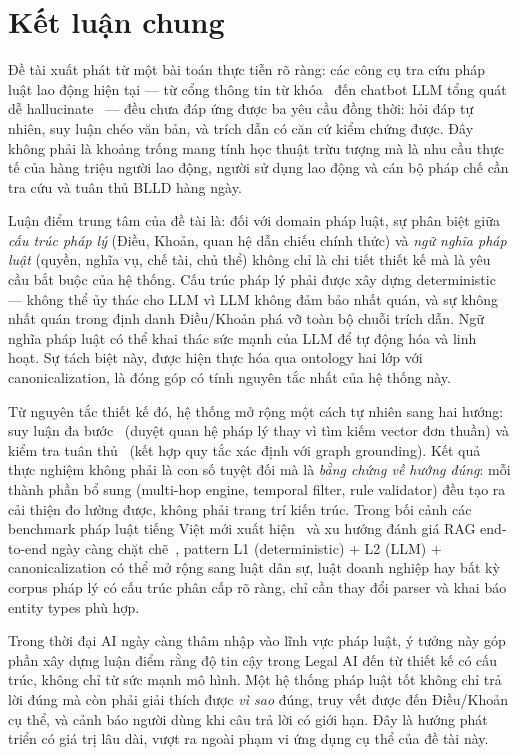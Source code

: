 \documentclass[../DoAn.tex]{subfiles}
\begin{document}
\section{Kết luận chung}
\label{section:6.5}

Đề tài xuất phát từ một bài toán thực tiễn rõ ràng: các công cụ tra cứu pháp luật lao động hiện tại --- từ cổng thông tin từ khóa~\cite{robertson1994bm25} đến chatbot LLM tổng quát dễ hallucinate~\cite{ji2023hallucination} --- đều chưa đáp ứng được ba yêu cầu đồng thời: hỏi đáp tự nhiên, suy luận chéo văn bản, và trích dẫn có căn cứ kiểm chứng được. Đây không phải là khoảng trống mang tính học thuật trừu tượng mà là nhu cầu thực tế của hàng triệu người lao động, người sử dụng lao động và cán bộ pháp chế cần tra cứu và tuân thủ \gls{BLLD} hàng ngày.

Luận điểm trung tâm của đề tài là: đối với domain pháp luật, sự phân biệt giữa \emph{cấu trúc pháp lý} (Điều, Khoản, quan hệ dẫn chiếu chính thức) và \emph{ngữ nghĩa pháp luật} (quyền, nghĩa vụ, chế tài, chủ thể) không chỉ là chi tiết thiết kế mà là yêu cầu bắt buộc của hệ thống. Cấu trúc pháp lý phải được xây dựng deterministic --- không thể ủy thác cho LLM vì LLM không đảm bảo nhất quán, và sự không nhất quán trong định danh Điều/Khoản phá vỡ toàn bộ chuỗi trích dẫn. Ngữ nghĩa pháp luật có thể khai thác sức mạnh của LLM để tự động hóa và linh hoạt. Sự tách biệt này, được hiện thực hóa qua ontology hai lớp với canonicalization, là đóng góp có tính nguyên tắc nhất của hệ thống này.

Từ nguyên tắc thiết kế đó, hệ thống mở rộng một cách tự nhiên sang hai hướng: suy luận đa bước~\cite{trivedi2022ircot} (duyệt quan hệ pháp lý thay vì tìm kiếm vector đơn thuần) và kiểm tra tuân thủ~\cite{hendrycks2021cuad} (kết hợp quy tắc xác định với graph grounding). Kết quả thực nghiệm không phải là con số tuyệt đối mà là \emph{bằng chứng về hướng đúng}: mỗi thành phần bổ sung (multi-hop engine, temporal filter, rule validator) đều tạo ra cải thiện đo lường được, không phải trang trí kiến trúc. Trong bối cảnh các benchmark pháp luật tiếng Việt mới xuất hiện~\cite{dong2025vietlegal} và xu hướng đánh giá RAG end-to-end ngày càng chặt chẽ~\cite{butler2026legalragbench,das2026claimraglaw}, pattern L1 (deterministic) + L2 (LLM) + canonicalization có thể mở rộng sang luật dân sự, luật doanh nghiệp hay bất kỳ corpus pháp lý có cấu trúc phân cấp rõ ràng, chỉ cần thay đổi parser và khai báo entity types phù hợp.

Trong thời đại AI ngày càng thâm nhập vào lĩnh vực pháp luật, ý tưởng này góp phần xây dựng luận điểm rằng độ tin cậy trong Legal AI đến từ thiết kế có cấu trúc, không chỉ từ sức mạnh mô hình. Một hệ thống pháp luật tốt không chỉ trả lời đúng mà còn phải giải thích được \emph{vì sao} đúng, truy vết được đến Điều/Khoản cụ thể, và cảnh báo người dùng khi câu trả lời có giới hạn. Đây là hướng phát triển có giá trị lâu dài, vượt ra ngoài phạm vi ứng dụng cụ thể của đề tài này.
\end{document}
